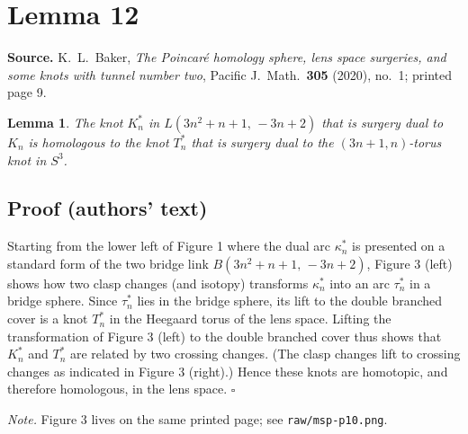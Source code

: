 \documentclass[11pt]{article}
\newtheorem{lemma}{Lemma}
\begin{document}
\section*{Lemma 12}

\textbf{Source.} K.~L.~Baker, \emph{The Poincar\'e homology sphere, lens space surgeries, and some
knots with tunnel number two}, Pacific J.\ Math.\ \textbf{305} (2020), no.~1; printed page 9.

\begin{lemma}
The knot $K_n^*$ in $L(3n^2+n+1,\,-3n+2)$ that is surgery dual to $K_n$ is homologous to the knot
$T_n^*$ that is surgery dual to the $(3n+1,n)$-torus knot in $S^3$.
\end{lemma}

\subsection*{Proof (authors' text)}

Starting from the lower left of Figure 1 where the dual arc $\kappa_n^*$ is presented on a standard
form of the two bridge link $B(3n^2+n+1,\,-3n+2)$, Figure 3 (left) shows how two clasp changes (and
isotopy) transforms $\kappa_n^*$ into an arc $\tau_n^*$ in a bridge sphere. Since $\tau_n^*$ lies in
the bridge sphere, its lift to the double branched cover is a knot $T_n^*$ in the Heegaard torus of
the lens space. Lifting the transformation of Figure 3 (left) to the double branched cover thus shows
that $K_n^*$ and $T_n^*$ are related by two crossing changes. (The clasp changes lift to crossing
changes as indicated in Figure 3 (right).) Hence these knots are homotopic, and therefore homologous,
in the lens space. \hfill$\square$

\medskip
\noindent\textit{Note.} Figure 3 lives on the same printed page; see \texttt{raw/msp-p10.png}.
\end{document}
